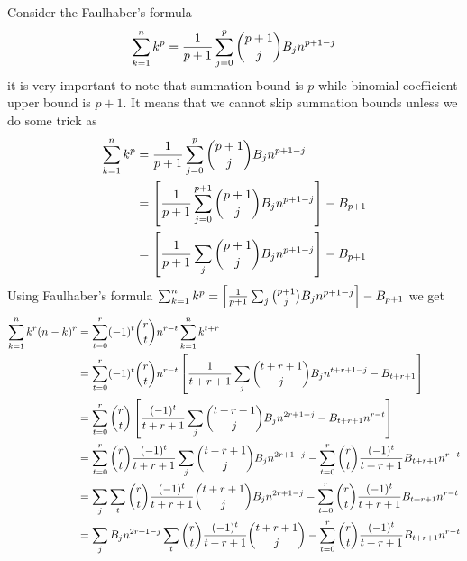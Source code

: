 Consider the Faulhaber's formula
\begin{equation}
    \sum_{k=1}^{n} k^{p} = \frac{1}{p+1}\sum_{j=0}^{p} \binom{p+1}{j} {B}\sb{j} n^{p+1-j}\label{eq:equation3}
\end{equation}
it is very important to note that summation bound is $p$ while binomial coefficient upper bound is $p+1$.
It means that we cannot skip summation bounds unless we do some trick as
\begin{equation}
    \begin{split}
        \sum_{k=1}^{n} k^{p} &= \frac{1}{p+1}\sum_{j=0}^{p} \binom{p+1}{j} {B}\sb{j} n^{p+1-j} \\
        &= \left[ \frac{1}{p+1}\sum_{j=0}^{p+1} \binom{p+1}{j} {B}\sb{j} n^{p+1-j} \right] - {B}\sb{p+1} \\
        &= \left[ \frac{1}{p+1}\sum_{j} \binom{p+1}{j} {B}\sb{j} n^{p+1-j} \right] - {B}\sb{p+1} \\
    \end{split}\label{eq:faulhaber-formula}
\end{equation}
Using Faulhaber's formula
$\sum_{k=1}^{n} k^{p} = \left[ \frac{1}{p+1}\sum_{j} \binom{p+1}{j} {B}\sb{j} n^{p+1-j} \right] - {B}\sb{p+1}$
we get
\begin{equation}
    \begin{split}
        \sum_{k=1}^{n} k^{r} (n-k)^{r}
        &= \sum_{t=0}^{r} (-1)^t \binom{r}{t} n^{r-t} \sum_{k=1}^{n} k^{t+r} \\
        &= \sum_{t=0}^{r} (-1)^t \binom{r}{t} n^{r-t} \left[ \frac{1}{t+r+1} \sum_{j} \binom{t+r+1}{j} {B}\sb{j} n^{t+r+1-j} - {B}\sb{t+r+1} \right] \\
        &= \sum_{t=0}^{r} \binom{r}{t} \left[ \frac{(-1)^t}{t+r+1} \sum_{j} \binom{t+r+1}{j} {B}\sb{j} n^{2r+1-j} - {B}\sb{t+r+1} n^{r-t} \right] \\
        &= \sum_{t=0}^{r} \binom{r}{t} \frac{(-1)^t}{t+r+1} \sum_{j} \binom{t+r+1}{j} {B}\sb{j} n^{2r+1-j} - \sum_{t=0}^{r} \binom{r}{t} \frac{(-1)^t}{t+r+1} {B}\sb{t+r+1} n^{r-t} \\
        &= \sum_{j} \sum_{t} \binom{r}{t} \frac{(-1)^t}{t+r+1} \binom{t+r+1}{j} {B}\sb{j} n^{2r+1-j} - \sum_{t=0}^{r} \binom{r}{t} \frac{(-1)^t}{t+r+1} {B}\sb{t+r+1} n^{r-t} \\
        &= \sum_{j} {B}\sb{j} n^{2r+1-j} \sum_{t} \binom{r}{t} \frac{(-1)^t}{t+r+1} \binom{t+r+1}{j} - \sum_{t=0}^{r} \binom{r}{t} \frac{(-1)^t}{t+r+1} {B}\sb{t+r+1} n^{r-t}
    \end{split}\label{eq:equation4}
\end{equation}
